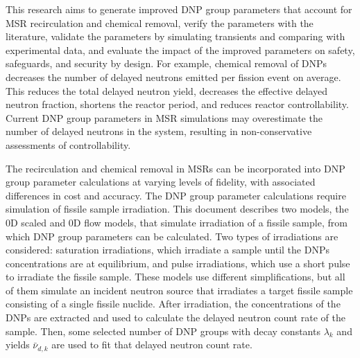 This research aims to generate improved \gls{DNP} group parameters that account for \gls{MSR} recirculation and chemical removal, verify the parameters with the literature, validate the parameters by simulating transients and comparing with experimental data, and evaluate the impact of the improved parameters on safety, safeguards, and security by design.
For example, chemical removal of \glspl{DNP} decreases the number of delayed neutrons emitted per fission event on average.
This reduces the total delayed neutron yield, decreases the effective delayed neutron fraction, shortens the reactor period, and reduces reactor controllability.
Current \gls{DNP} group parameters in \gls{MSR} simulations may overestimate the number of delayed neutrons in the system, resulting in non-conservative assessments of controllability.

The recirculation and chemical removal in \glspl{MSR} can be incorporated into \gls{DNP} group parameter calculations at varying levels of fidelity, with associated differences in cost and accuracy.
The \gls{DNP} group parameter calculations require simulation of fissile sample irradiation.
This document describes two models, the 0D scaled and 0D flow models, that simulate irradiation of a fissile sample, from which \gls{DNP} group parameters can be calculated.
Two types of irradiations are considered: saturation irradiations, which irradiate a sample until the \glspl{DNP} concentrations are at equilibrium, and pulse irradiations, which use a short pulse to irradiate the fissile sample.
These models use different simplifications, but all of them simulate an incident neutron source that irradiates a target fissile sample consisting of a single fissile nuclide.
After irradiation, the concentrations of the \glspl{DNP} are extracted and used to calculate the delayed neutron count rate of the sample.
Then, some selected number of \gls{DNP} groups with decay constants $\lambda_k$ and yields $\bar{\nu}_{d, k}$ are used to fit that delayed neutron count rate.

